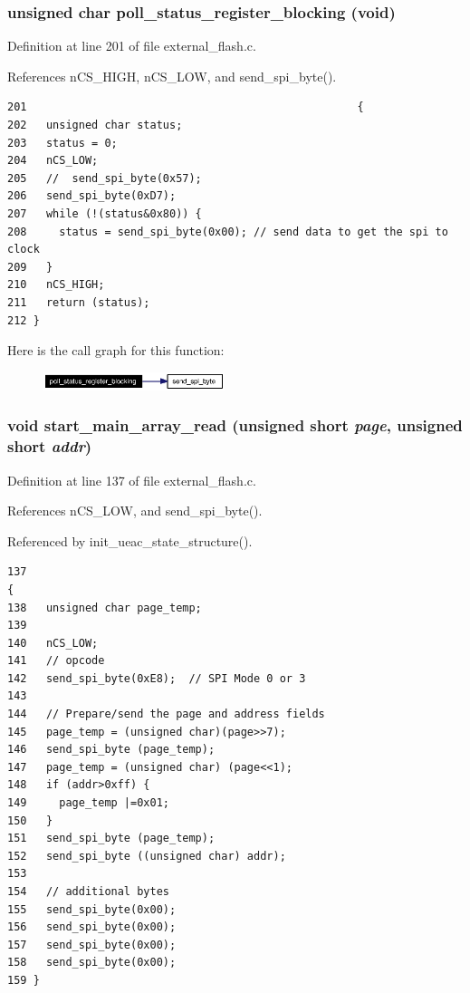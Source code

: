\subsubsection{\setlength{\rightskip}{0pt plus 5cm}unsigned char poll\_\-status\_\-register\_\-blocking (void)}\label{external__flash_8c_a6}




Definition at line 201 of file external\_\-flash.c.

References n\-CS\_\-HIGH, n\-CS\_\-LOW, and send\_\-spi\_\-byte().

\footnotesize\begin{verbatim}201                                                   {  
202   unsigned char status;
203   status = 0;
204   nCS_LOW;  
205   //  send_spi_byte(0x57);
206   send_spi_byte(0xD7);
207   while (!(status&0x80)) { 
208     status = send_spi_byte(0x00); // send data to get the spi to clock
209   }
210   nCS_HIGH;
211   return (status); 
212 }
\end{verbatim}\normalsize 




Here is the call graph for this function:\begin{figure}[H]
\begin{center}
\leavevmode
\includegraphics[width=150pt]{external__flash_8c_a6_cgraph}
\end{center}
\end{figure}
\subsubsection{\setlength{\rightskip}{0pt plus 5cm}void start\_\-main\_\-array\_\-read (unsigned short {\em page}, unsigned short {\em addr})}\label{external__flash_8c_a1}




Definition at line 137 of file external\_\-flash.c.

References n\-CS\_\-LOW, and send\_\-spi\_\-byte().

Referenced by init\_\-ueac\_\-state\_\-structure().

\footnotesize\begin{verbatim}137                                                                     {
138   unsigned char page_temp; 
139 
140   nCS_LOW;
141   // opcode
142   send_spi_byte(0xE8);  // SPI Mode 0 or 3  
143 
144   // Prepare/send the page and address fields
145   page_temp = (unsigned char)(page>>7);
146   send_spi_byte (page_temp);
147   page_temp = (unsigned char) (page<<1);
148   if (addr>0xff) {
149     page_temp |=0x01;
150   }
151   send_spi_byte (page_temp);
152   send_spi_byte ((unsigned char) addr);
153 
154   // additional bytes
155   send_spi_byte(0x00);
156   send_spi_byte(0x00);
157   send_spi_byte(0x00);
158   send_spi_byte(0x00);
159 }
\end{verbatim}\normalsize 




